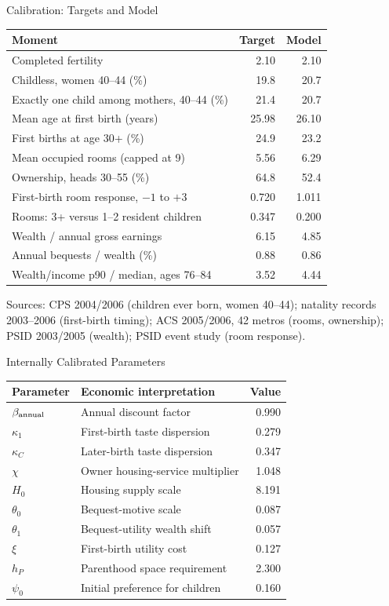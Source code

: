 \documentclass[11pt,aspectratio=169]{beamer}
\newcommand{\1}{\mathbf 1}
\begin{document}
\begin{frame}{Calibration: Targets and Model}
\footnotesize
\linespread{1}\selectfont
\renewcommand{\arraystretch}{1.12}
\begin{tabularx}{\textwidth}{@{}Xrr@{}}
\toprule
Moment & Target & Model \\
\midrule
Completed fertility & 2.10 & 2.10 \\
Childless, women 40--44 (\%) & 19.8 & 20.7 \\
Exactly one child among mothers, 40--44 (\%) & 21.4 & 20.7 \\
Mean age at first birth (years) & 25.98 & 26.10 \\
First births at age 30+ (\%) & 24.9 & 23.2 \\
\addlinespace[4pt]
Mean occupied rooms (capped at 9) & 5.56 & 6.29 \\
Ownership, heads 30--55 (\%) & 64.8 & 52.4 \\
First-birth room response, $-1$ to $+3$ & 0.720 & 1.011 \\
Rooms: 3+ versus 1--2 resident children & 0.347 & 0.200 \\
\addlinespace[4pt]
Wealth / annual gross earnings & 6.15 & 4.85 \\
Annual bequests / wealth (\%) & 0.88 & 0.86 \\
Wealth/income p90 / median, ages 76--84 & 3.52 & 4.44 \\
\bottomrule
\end{tabularx}\par
\smallskip
\scriptsize Sources: CPS 2004/2006 (children ever born, women 40--44); natality records 2003--2006 (first-birth timing); ACS 2005/2006, 42 metros (rooms, ownership); PSID 2003/2005 (wealth); PSID event study (room response).
\end{frame}
\begin{frame}{Internally Calibrated Parameters}
\footnotesize

\renewcommand{\arraystretch}{1.12}
\begin{tabularx}{\textwidth}{@{}lXr@{}}
\toprule
Parameter & Economic interpretation & Value \\
\midrule
$\beta_{\rm annual}$ & Annual discount factor & 0.990 \\
$\kappa_1$ & First-birth taste dispersion & 0.279 \\
$\kappa_C$ & Later-birth taste dispersion & 0.347 \\
$\chi$ & Owner housing-service multiplier & 1.048 \\
$H_0$ & Housing supply scale & 8.191 \\
$\theta_0$ & Bequest-motive scale & 0.087 \\
$\theta_1$ & Bequest-utility wealth shift & 0.057 \\
$\xi$ & First-birth utility cost & 0.127 \\
$h_P$ & Parenthood space requirement & 2.300 \\
$\psi_0$ & Initial preference for children & 0.160 \\

\bottomrule
\end{tabularx}
\end{frame}
\end{document}
